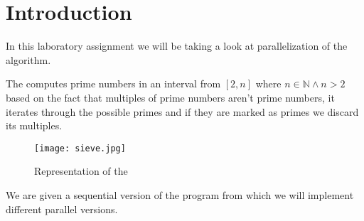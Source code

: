 \section{Introduction}
\justify
In this laboratory assignment we will be taking a look at \omp parallelization of the \sieve algorithm.
 
 \justify
The \sieve computes prime numbers in an interval from $[2,n]$ where $n\in \mathbb{N} \wedge n > 2$ based on the fact that multiples of prime numbers aren't prime numbers, it iterates through the possible primes and if they are marked as primes we discard its multiples. 

\begin{figure}[h!]
    \centering
    \texttt{[image: sieve.jpg]}
    \caption{Representation of the \sieve}
    \label{fig:tareador}
\end{figure}

\justify
We are given a sequential version of the program from which we will implement different parallel versions.


